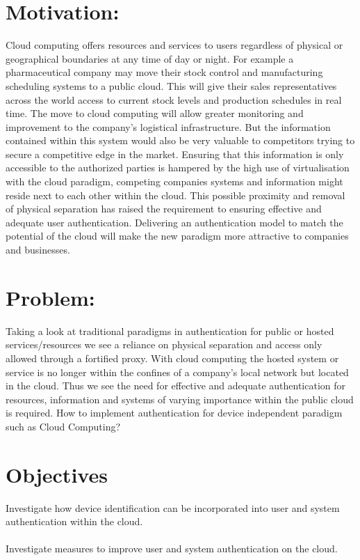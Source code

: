\documentclass[11pt]{article}
\begin{document}
\section{Motivation:}
Cloud computing offers resources and services to users regardless of physical or geographical boundaries at any time of day or night. For example a pharmaceutical company may move their stock control and manufacturing scheduling systems to a public cloud. This will give their sales representatives across the world access to current stock levels and production schedules in real time. The move to cloud computing will allow greater monitoring and improvement to the company’s logistical infrastructure. But the information contained within this system would also be very valuable to competitors trying to secure a competitive edge in the market. Ensuring that this information is only accessible to the authorized parties is hampered by the high use of virtualisation with the cloud paradigm, competing companies systems and information might reside next to each other within the cloud. This possible proximity and removal of physical separation has raised the requirement to ensuring effective and adequate user authentication. Delivering an authentication model to match the potential of the cloud will make the new paradigm more attractive to companies and businesses. 

\section{Problem:}
Taking a look at traditional paradigms in authentication for public or hosted services/resources we see a reliance on physical separation and access only allowed through a fortified proxy. With cloud computing the hosted system or service is no longer within the confines of a company’s local network but located in the cloud. Thus we see the need for effective and adequate authentication for resources, information and systems of varying importance within the public cloud is required.  
How to implement authentication for device independent paradigm such as Cloud Computing? 

\section{Objectives}
Investigate how device identification can be incorporated into user and system authentication within the cloud.\\ \\
Investigate measures to improve user and system authentication on the cloud. 
\end{document}
